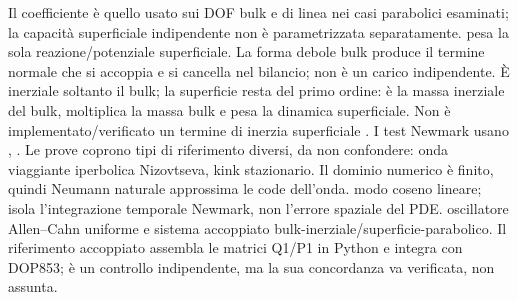 {}Il coefficiente  è quello usato sui DOF bulk e di linea nei casi parabolici esaminati; la capacità superficiale indipendente non è parametrizzata separatamente.  pesa la sola reazione/potenziale superficiale. La forma debole bulk produce il termine normale che si accoppia e si cancella nel bilancio; non è un carico indipendente.\markdownRendererInterblockSeparator
{} È inerziale soltanto il bulk; la superficie resta del primo ordine:\markdownRendererInterblockSeparator
{}\markdownRendererInterblockSeparator
{} è la massa inerziale del bulk,  \markdownRendererInlineMath{\zeta} moltiplica la massa bulk e   pesa la dinamica superficiale. Non è implementato/verificato un termine di inerzia superficiale . I test Newmark usano , .\markdownRendererInterblockSeparator
{}
\markdownRendererSectionEnd \markdownRendererSectionBegin
{}\markdownRendererInterblockSeparator
{}Le prove coprono tipi di riferimento diversi, da non confondere:\markdownRendererInterblockSeparator
{}\markdownRendererUlBeginTight
\markdownRendererUlItem {} onda viaggiante iperbolica Nizovtseva, kink stazionario. Il dominio numerico è finito, quindi Neumann naturale approssima le code dell’onda.\markdownRendererUlItemEnd 
\markdownRendererUlItem {} modo coseno lineare; isola l’integrazione temporale Newmark, non l’errore spaziale del PDE.\markdownRendererUlItemEnd 
\markdownRendererUlItem {} oscillatore Allen–Cahn uniforme e sistema accoppiato bulk-inerziale/superficie-parabolico. Il riferimento accoppiato assembla le matrici Q1/P1 in Python e integra con DOP853; è un controllo indipendente, ma la sua concordanza va verificata, non assunta.\markdownRendererUlItemEnd 
